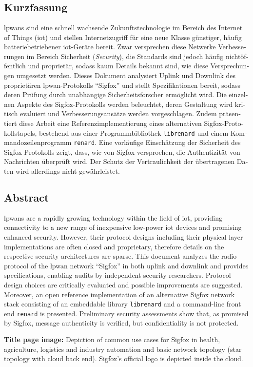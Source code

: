\chapter*{}
\begin{otherlanguage}{ngerman}

\vspace{-0.5cm}

\section*{Kurzfassung}
\Glspl{lpwan} sind eine schnell wachsende Zukunftstechnologie im Bereich des Internet of Things (\gls{iot}) und stellen Internetzugriff für eine neue Klasse günstiger, häufig batteriebetriebener \gls{iot}-Geräte bereit.
Zwar versprechen diese Netwerke Verbesserungen im Bereich Sicherheit (\textit{Security}), die Standards sind jedoch häufig nichtöffentlich und proprietär, sodass kaum Details bekannt sind, wie diese Versprechungen umgesetzt werden.
Dieses Dokument analysiert Uplink und Downlink des proprietären \gls{lpwan}-Protokolls ``Sigfox'' und stellt Spezifikationen bereit, sodass deren Prüfung durch unabhängige Sicherheitsforscher ermöglicht wird.
Die einzelnen Aspekte des Sigfox-Protokolls werden beleuchtet, deren Gestaltung wird kritisch evaluiert und Verbesserungsansätze werden vorgeschlagen.
Zudem präsentiert diese Arbeit eine Referenzimplementierung eines alternativen Sigfox-Protokollstapels, bestehend aus einer Programmbibliothek \texttt{librenard} und einem Kommandozeilenprogramm \texttt{renard}.
Eine vorläufige Einschätzung der Sicherheit des Sigfox-Protokolls zeigt, dass, wie von Sigfox versprochen, die Authentizität von Nachrichten überprüft wird.
Der Schutz der Vertraulichkeit der übertragenen Daten wird allerdings nicht gewährleistet.

\end{otherlanguage}

\vspace{-0.5cm}

\section*{Abstract}
\Glspl{lpwan} are a rapidly growing technology within the field of \gls{iot}, providing connectivity to a new range of inexpensive low-power \gls{iot} devices and promising enhanced security.
However, their protocol designs including their physical layer implementations are often closed and proprietary, therefore details on the respective security architectures are sparse.
This document analyzes the radio protocol of the \gls{lpwan} network ``Sigfox'' in both uplink and downlink and provides specifications, enabling audits by independent security researchers.
Protocol design choices are critically evaluated and possible improvements are suggested.
Moreover, an open reference implementation of an alternative Sigfox network stack consisting of an embeddable library \texttt{librenard} and a command-line front end \texttt{renard} is presented.
Preliminary security assessments show that, as promised by Sigfox, message authenticity is verified, but confidentiality is not protected.


\vfill
\textbf{Title page image:} Depiction of common use cases for Sigfox in health, agriculture, logistics and industry automation and basic network topology (star topology with cloud back end). Sigfox's official logo is depicted inside the cloud.
